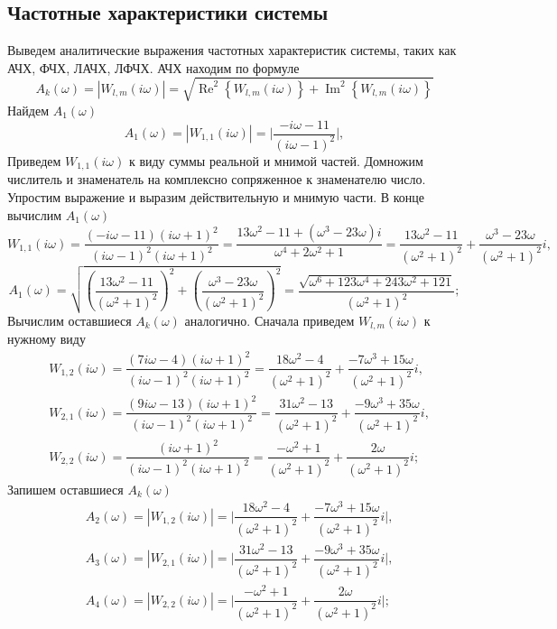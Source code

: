 \documentclass[a4paper, 12pt]{article}
\begin{document}
    \subsection{Частотные характеристики системы}
    Выведем аналитические выражения частотных характеристик системы,
    таких как АЧХ, ФЧХ, ЛАЧХ, ЛФЧХ. АЧХ находим по формуле
    $$
    A_k(\omega)=|W_{l,m}(i\omega)|=\sqrt{\operatorname{Re}^2\left\{ W_{l,m}(i\omega)\right\}+\operatorname{Im}^2\left\{ W_{l,m}(i\omega) \right\}}
    $$
    Найдем $A_1(\omega)$
    $$
    A_1\left( \omega \right)=|W_{1,1}(i\omega)|=\bigg|\dfrac{-i\omega-11}{(i\omega-1)^2}\bigg|,
    $$
    Приведем $W_{1,1}(i\omega)$ к виду суммы реальной и мнимой частей. Домножим числитель и знаменатель
    на комплексно сопряженное к знаменателю число. Упростим выражение и выразим действительную и мнимую части.
    В конце вычислим $A_1(\omega)$
    $$
    W_{1,1}(i\omega)=\dfrac{\left(-i\omega-11\right)\left( i\omega+1 \right)^2}{(i\omega-1)^2\left( i\omega+1 \right)^2}=\dfrac{13\omega^2-11+\left( \omega^3-23\omega \right)i}{\omega^4+2\omega^2+1}=
    \dfrac{13\omega^2-11}{\left( \omega^2+1 \right)^2}+\dfrac{\omega^3-23\omega}{\left(\omega^2+1\right)^2}i,
    $$
    $$
    A_1(\omega)=\sqrt{\left( \dfrac{13\omega^2-11}{\left( \omega^2+1 \right)^2} \right)^2+\left( \dfrac{\omega^3-23\omega}{\left( \omega^2+1 \right)^2} \right)^2}=\dfrac{\sqrt{\omega^6+123\omega^4+243\omega^2+121}}{\left( \omega^2+1 \right)^2};
    $$
    Вычислим оставшиеся $A_k\left( \omega \right)$ аналогично. Сначала приведем $W_{l,m}(i\omega)$ к нужному виду
    \begin{align*}
    &W_{1,2}(i\omega)=\dfrac{\left(7i\omega-4\right)\left( i\omega+1 \right)^2}{(i\omega-1)^2\left( i\omega+1 \right)^2}=\dfrac{18\omega^2-4}{\left( \omega^2+1 \right)^2}+\dfrac{-7\omega^3+15\omega}{\left( \omega^2+1 \right)^2}i,\\
    &W_{2,1}(i\omega)=\dfrac{\left(9i\omega-13\right)\left( i\omega+1 \right)^2}{\left( i\omega-1 \right)^2\left( i\omega+1 \right)^2}=\dfrac{31\omega^2-13}{\left( \omega^2+1 \right)^2}+\dfrac{-9\omega^3+35\omega}{\left( \omega^2+1 \right)^2}i,\\
    &W_{2,2}(i\omega)=\dfrac{\left( i\omega+1 \right)^2}{\left( i\omega-1 \right)^2\left( i\omega+1 \right)^2}=\dfrac{-\omega^2+1}{\left( \omega^2+1 \right)^2}+\dfrac{2\omega}{\left( \omega^2+1 \right)^2}i;
    \end{align*}
    Запишем оставшиеся $A_k(\omega)$
    \begin{align*}
        &A_2\left( \omega \right)=|W_{1,2}(i\omega)|=\bigg|\dfrac{18\omega^2-4}{\left( \omega^2+1 \right)^2}+\dfrac{-7\omega^3+15\omega}{\left( \omega^2+1 \right)^2}i\bigg|,\\
        &A_3(\omega)=|W_{2,1}(i\omega)|=\bigg|\dfrac{31\omega^2-13}{\left( \omega^2+1 \right)^2}+\dfrac{-9\omega^3+35\omega}{\left( \omega^2+1 \right)^2}i\bigg|,\\
        &A_4\left( \omega \right)=|W_{2,2}(i\omega)|=\bigg|\dfrac{-\omega^2+1}{\left( \omega^2+1 \right)^2}+\dfrac{2\omega}{\left( \omega^2+1 \right)^2}i\bigg|;
    \end{align*}
\end{document}
